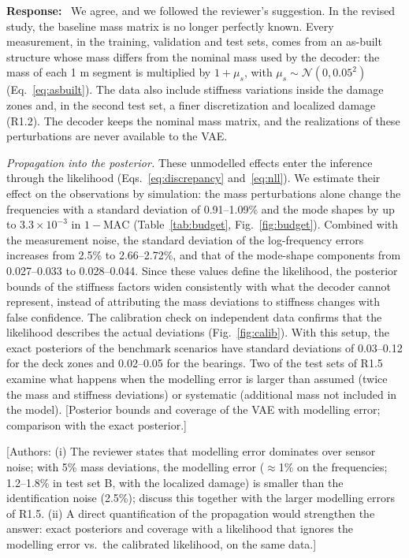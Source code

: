 \documentclass[11pt]{article}
\newenvironment{response}{\par\smallskip\noindent\color{resp}\textbf{Response:}\ }{\par}
\newcommand{\authornote}[1]{\textcolor{note}{\textsf{[Authors: #1]}}}
\newcommand{\tbd}[1]{\textcolor{note}{\textsf{[#1]}}}
\begin{document}
\begin{response}
We agree, and we followed the reviewer's suggestion. In the revised study, the baseline mass matrix is no longer
perfectly known. Every measurement, in the training, validation and test sets, comes from an as-built structure whose
mass differs from the nominal mass used by the decoder: the mass of each 1 m segment is multiplied by $1+\mu_s$, with
$\mu_s\sim\mathcal{N}(0,0.05^2)$ (Eq.~\eqref{eq:asbuilt}). The data also include stiffness variations inside the
damage zones and, in the second test set, a finer discretization and localized damage (R1.2). The decoder keeps the
nominal mass matrix, and
the realizations of these perturbations are never available to the VAE.

\textit{Propagation into the posterior.} These unmodelled effects enter the inference through the likelihood
(Eqs.~\eqref{eq:discrepancy} and~\eqref{eq:nll}). We estimate their effect on the observations by simulation: the mass
perturbations alone change the frequencies with a standard deviation of 0.91--1.09\% and the mode shapes by up to
$3.3\times10^{-3}$ in $1-\mathrm{MAC}$ (Table~\ref{tab:budget}, Fig.~\ref{fig:budget}). Combined with the measurement
noise, the standard deviation of the log-frequency errors increases from 2.5\% to 2.66--2.72\%, and that of the
mode-shape components from 0.027--0.033 to 0.028--0.044. Since these values define the likelihood, the posterior bounds of the stiffness
factors widen consistently with what the decoder cannot represent, instead of attributing the mass deviations to
stiffness changes with false confidence. The calibration check on independent data confirms that the likelihood
describes the actual deviations (Fig.~\ref{fig:calib}). With this setup, the exact posteriors of the benchmark scenarios
have standard deviations of 0.03--0.12 for the deck zones and 0.02--0.05 for the bearings. Two of the test sets of R1.5
examine what happens when the modelling error is larger than assumed (twice the mass and stiffness deviations) or
systematic (additional mass not included in the model).
\tbd{Posterior bounds and coverage of the VAE with modelling error; comparison with the exact posterior.}
\end{response}
\authornote{(i) The reviewer states that modelling error dominates over sensor noise; with 5\% mass deviations, the
modelling error ($\approx$1\% on the frequencies; 1.2--1.8\% in test set B, with the localized damage) is smaller than
the identification noise (2.5\%); discuss this together with the larger modelling errors of R1.5. (ii) A direct
quantification of the propagation would
strengthen the answer: exact posteriors and coverage with a likelihood that ignores the modelling error vs.\ the
calibrated likelihood, on the same data.}
\end{document}
